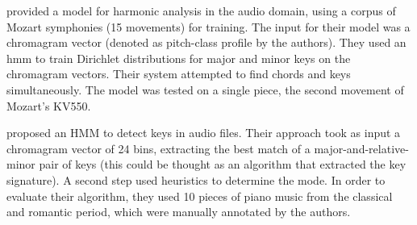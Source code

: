 \textcite{burgoyne2005learning} provided a model for
harmonic analysis in the audio domain, using a corpus of
Mozart symphonies (15 movements) for training. The input for
their model was a chromagram vector (denoted as pitch-class
profile by the authors). They used an \acrshort{hmm} to
train Dirichlet distributions for major and minor keys on
the chromagram vectors. Their system attempted to find
chords and keys simultaneously. The model was tested on a
single piece, the second movement of Mozart's KV550.

\textcite{chai2005detection} proposed an HMM to detect keys
in audio files. Their approach took as input a chromagram
vector of 24 bins, extracting the best match of a
major-and-relative-minor pair of keys (this could be thought
as an algorithm that extracted the key signature). A second
step used heuristics to determine the mode. In order to
evaluate their algorithm, they used 10 pieces of piano music
from the classical and romantic period, which were manually
annotated by the authors.



